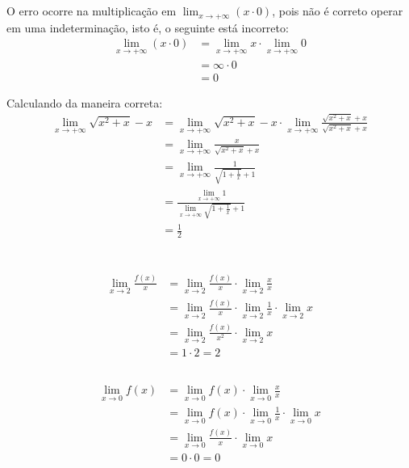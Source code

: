 \documentclass[12pt]{article}
\begin{document}
\section{}
O erro ocorre na multiplicação em \(\lim_{x\rightarrow +\infty} (x\cdot0)\), pois não é correto operar em uma indeterminação, isto é, o seguinte está incorreto:
\begin{align*}
    \lim_{x\rightarrow +\infty} (x\cdot0)
    &= \lim_{x\rightarrow +\infty} x \cdot \lim_{x\rightarrow +\infty} 0\\
    &= \infty \cdot 0 \\
    &= 0
\end{align*}

Calculando da maneira correta:
\begin{align*}
    \lim_{x\rightarrow +\infty} \sqrt{x^2+x}-x
    &= \lim_{x\rightarrow +\infty} \sqrt{x^2+x}-x \cdot \lim_{x\rightarrow +\infty} \frac{\sqrt{x^2+x}+x}{\sqrt{x^2+x}+x} \\
    &= \lim_{x\rightarrow +\infty} \frac{x}{\sqrt{x^2+x}+x} \\
    &= \lim_{x\rightarrow +\infty} \frac{1}{\sqrt{1+\frac{1}{x}}+1} \\
    &= \frac{\lim_{x\rightarrow +\infty} 1}{\lim_{x\rightarrow +\infty} \sqrt{1+\frac{1}{x}}+1} \\
    &= \frac{1}{2}
\end{align*}

\section{}
\subsection{}
\begin{align*}
    \lim_{x\rightarrow 2} \frac{f(x)}{x}
    &= \lim_{x\rightarrow 2} \frac{f(x)}{x} \cdot \lim_{x\rightarrow 2} \frac{x}{x} \\
    &= \lim_{x\rightarrow 2} \frac{f(x)}{x} \cdot \lim_{x\rightarrow 2} \frac{1}{x} \cdot \lim_{x\rightarrow 2} x \\
    &= \lim_{x\rightarrow 2} \frac{f(x)}{x^2} \cdot \lim_{x\rightarrow 2} x \\
    &= 1 \cdot 2 = 2
\end{align*}
\subsection{}
\begin{align*}
    \lim_{x\rightarrow 0} f(x)
    &= \lim_{x\rightarrow 0} f(x) \cdot \lim_{x\rightarrow 0} \frac{x}{x} \\
    &= \lim_{x\rightarrow 0} f(x) \cdot \lim_{x\rightarrow 0} \frac{1}{x} \cdot \lim_{x\rightarrow 0} x \\
    &= \lim_{x\rightarrow 0} \frac{f(x)}{x} \cdot \lim_{x\rightarrow 0} x \\
    &= 0 \cdot 0 = 0
\end{align*}
\end{document}
